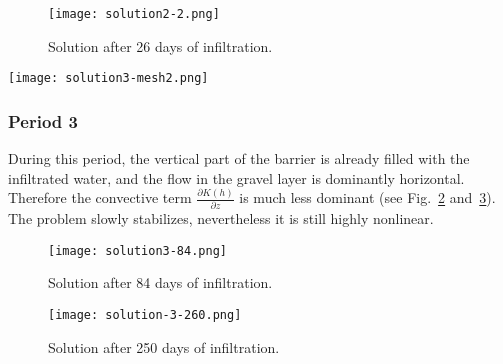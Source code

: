 \documentclass[final,3p,times,twocolumn]{elsarticle}
\begin{document}
\begin{figure}[!htb]
\begin{center}
\texttt{[image: solution2-2.png]}
\end{center}
\vspace{-4mm}
\caption{Solution after 26 days of infiltration. }
\label{fig:solution2.2}
\end{figure}

\begin{figure*}[!htb]
\begin{center}
\texttt{[image: solution3-mesh2.png]}
\end{center}
\vspace{-4mm}
\caption{Detail of finite element meshes after 26 days of infiltration. \textbf{Left:} mesh for $h$-FEM $p$=1. \textbf{Right:} mesh for $hp$-FEM.}
\label{fig:solution2-mesh}
\end{figure*}


\subsubsection{Period 3}
During this period, the vertical part of the barrier is already filled with the infiltrated water, 
and the flow in the gravel layer is dominantly horizontal. Therefore the convective term 
$\frac{\partial K(h)}{\partial z}$ is much less dominant (see Fig.~\ref{fig:solution3.1} 
and~\ref{fig:solution3.2}). The problem slowly stabilizes, nevertheless it is still highly nonlinear.



\begin{figure}[!htb]
\begin{center}
\texttt{[image: solution3-84.png]}
\end{center}
\vspace{-4mm}
\caption{Solution after 84 days of infiltration. }
\label{fig:solution3.1}
\end{figure}

\begin{figure}[!htb]
\begin{center}
\texttt{[image: solution-3-260.png]}
\end{center}
\vspace{-4mm}
\caption{Solution after 250 days of infiltration.}
\label{fig:solution3.2}
\end{figure}
\end{document}
